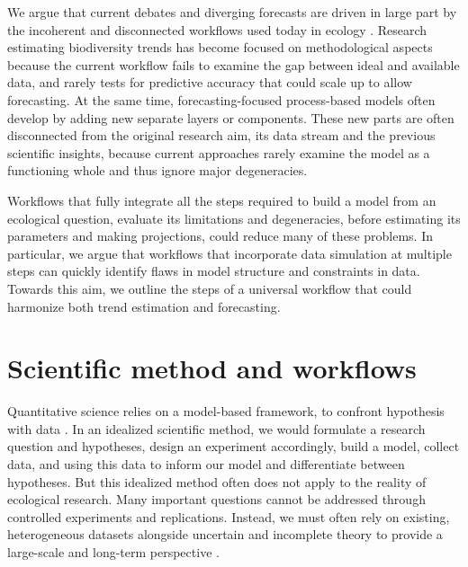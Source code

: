 \documentclass[11pt]{article}
\begin{document}
We argue that current debates and diverging forecasts are driven in large part by the incoherent and disconnected workflows used today in ecology \citep{Loreau2022, Talis2023, Johnson2024}. Research estimating biodiversity trends has become focused on methodological aspects because the current workflow fails to examine the gap between ideal and available data, and rarely tests for predictive accuracy that could scale up to allow forecasting. At the same time, forecasting-focused process-based models often develop by adding new separate layers or components. These new parts are often disconnected from the original research aim, its data stream and the previous scientific insights, because current approaches rarely examine the model as a functioning whole and thus ignore major degeneracies. 

Workflows that fully integrate all the steps required to build a model from an ecological question, evaluate its limitations and degeneracies, before estimating its parameters and making projections, could reduce many of these problems. In particular, we argue that workflows that incorporate data simulation at multiple steps can quickly identify flaws in model structure and constraints in data. Towards this aim,  we outline the steps of a universal workflow that could harmonize both trend estimation and forecasting.

\section{Scientific method and workflows}

Quantitative science relies on a model-based framework, to confront hypothesis with data \citep{Chamberlin:1965cd}. In an idealized scientific method, we would formulate a research question and hypotheses, design an experiment accordingly, build a model, collect data, and using this data to inform our model and differentiate between hypotheses. But this idealized method often does not apply to the reality of ecological research. Many important questions cannot be addressed through controlled experiments and replications. Instead, we must often rely on existing, heterogeneous datasets alongside uncertain and incomplete theory to provide a large-scale and long-term perspective \citep{Hilborn1997}.
\end{document}
